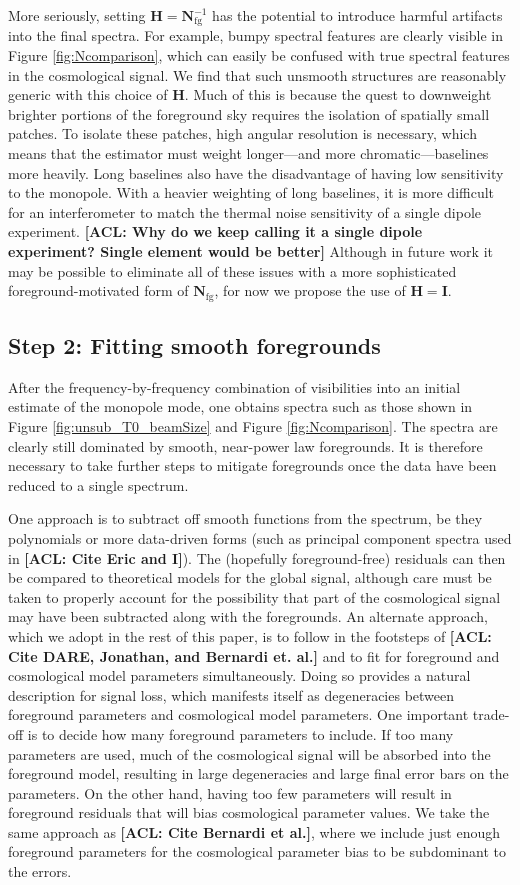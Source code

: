\documentclass[twolcolumn,apj,iop,numberedappendix]{emulateapj}
\newcommand{\Hmat}{\mathbf{H}}
\newcommand{\Nfg}{\mathbf{N}_{\textrm{fg}}}
\newcommand{\acl}[1]{{\color{red} \textbf{[ACL:  #1]}}}
\begin{document}
More seriously, setting $\Hmat = \Nfg^{-1}$ has the potential to introduce harmful artifacts into the final spectra. For example, bumpy spectral features are clearly visible in Figure \ref{fig:Ncomparison}, which can easily be confused with true spectral features in the cosmological signal. We find that such unsmooth structures are reasonably generic with this choice of $\Hmat$. Much of this is because the quest to downweight brighter portions of the foreground sky requires the isolation of spatially small patches. To isolate these patches, high angular resolution is necessary, which means that the estimator must weight longer---and more chromatic---baselines more heavily. Long baselines also have the disadvantage of having low sensitivity to the monopole. With a heavier weighting of long baselines, it is more difficult for an interferometer to match the thermal noise sensitivity of a single dipole experiment. \acl{Why do we keep calling it a single dipole experiment? Single element would be better} Although in future work it may be possible to eliminate all of these issues with a more sophisticated foreground-motivated form of $\Nfg$, for now we propose the use of $\Hmat = \mathbf{I}$.

\subsection{Step 2: Fitting smooth foregrounds}
\label{sec:fitting}
After the frequency-by-frequency combination of visibilities into an initial estimate of the monopole mode, one obtains spectra such as those shown in Figure \ref{fig:unsub_T0_beamSize} and Figure \ref{fig:Ncomparison}. The spectra are clearly still dominated by smooth, near-power law foregrounds. It is therefore necessary to take further steps to mitigate foregrounds once the data have been reduced to a single spectrum.

One approach is to subtract off smooth functions from the spectrum, be they polynomials or more data-driven forms (such as principal component spectra used in \acl{Cite Eric and I}). The (hopefully foreground-free) residuals can then be compared to theoretical models for the global signal, although care must be taken to properly account for the possibility that part of the cosmological signal may have been subtracted along with the foregrounds. An alternate approach, which we adopt in the rest of this paper, is to follow in the footsteps of \acl{Cite DARE, Jonathan, and Bernardi et. al.} and to fit for foreground and cosmological model parameters simultaneously. Doing so provides a natural description for signal loss, which manifests itself as degeneracies between foreground parameters and cosmological model parameters. One important trade-off is to decide how many foreground parameters to include. If too many parameters are used, much of the cosmological signal will be absorbed into the foreground model, resulting in large degeneracies and large final error bars on the parameters. On the other hand, having too few parameters will result in foreground residuals that will bias cosmological parameter values. We take the same approach as \acl{Cite Bernardi et al.}, where we include just enough foreground parameters for the cosmological parameter bias to be subdominant to the errors.
\end{document}

